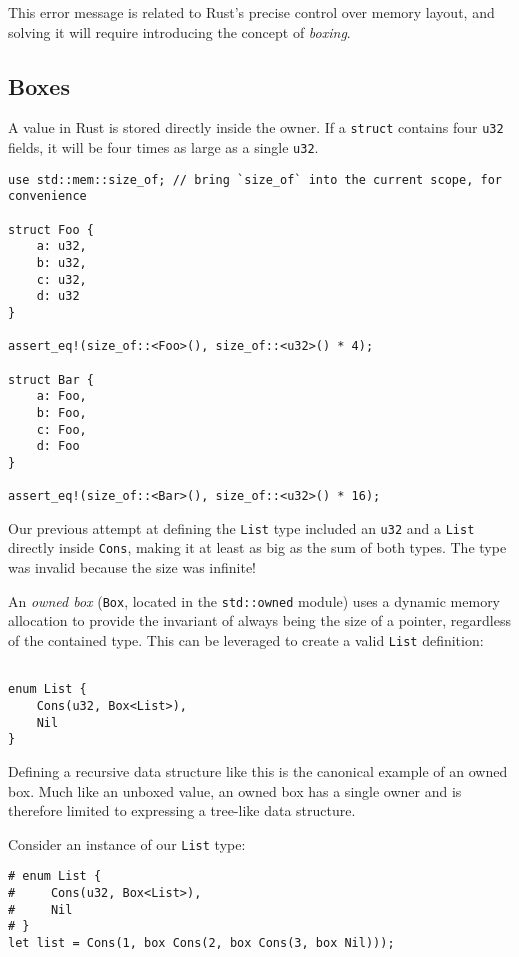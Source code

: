 \documentclass[]{article}
\begin{document}
This error message is related to Rust's precise control over memory
layout, and solving it will require introducing the concept of
\emph{boxing}.

\subsection{Boxes}\label{boxes}

A value in Rust is stored directly inside the owner. If a
\texttt{struct} contains four \texttt{u32} fields, it will be four times
as large as a single \texttt{u32}.

\begin{verbatim}
use std::mem::size_of; // bring `size_of` into the current scope, for convenience

struct Foo {
    a: u32,
    b: u32,
    c: u32,
    d: u32
}

assert_eq!(size_of::<Foo>(), size_of::<u32>() * 4);

struct Bar {
    a: Foo,
    b: Foo,
    c: Foo,
    d: Foo
}

assert_eq!(size_of::<Bar>(), size_of::<u32>() * 16);
\end{verbatim}

Our previous attempt at defining the \texttt{List} type included an
\texttt{u32} and a \texttt{List} directly inside \texttt{Cons}, making
it at least as big as the sum of both types. The type was invalid
because the size was infinite!

An \emph{owned box} (\texttt{Box}, located in the \texttt{std::owned}
module) uses a dynamic memory allocation to provide the invariant of
always being the size of a pointer, regardless of the contained type.
This can be leveraged to create a valid \texttt{List} definition:

\begin{verbatim}

enum List {
    Cons(u32, Box<List>),
    Nil
}
\end{verbatim}

Defining a recursive data structure like this is the canonical example
of an owned box. Much like an unboxed value, an owned box has a single
owner and is therefore limited to expressing a tree-like data structure.

Consider an instance of our \texttt{List} type:

\begin{verbatim}
# enum List {
#     Cons(u32, Box<List>),
#     Nil
# }
let list = Cons(1, box Cons(2, box Cons(3, box Nil)));
\end{verbatim}
\end{document}
